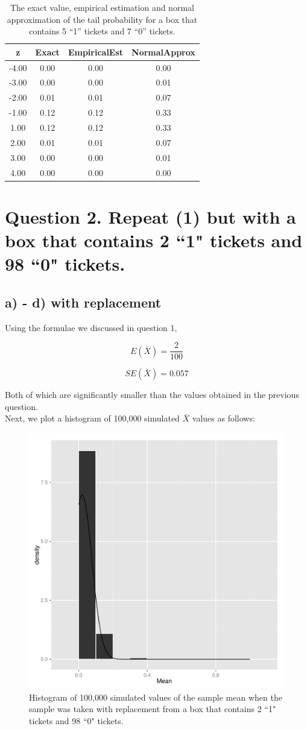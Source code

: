 \documentclass[11pt]{article}
\begin{document}
\begin{table}[H]
\centering
\begin{tabular}{|c|ccc|}
  \hline
z & Exact & EmpiricalEst & NormalApprox \\ 
  \hline
-4.00 & 0.00 & 0.00 & 0.00 \\ 
  -3.00 & 0.00 & 0.00 & 0.01 \\ 
  -2.00 & 0.01 & 0.01 & 0.07 \\ 
  -1.00 & 0.12 & 0.12 & 0.33 \\ 
  1.00 & 0.12 & 0.12 & 0.33 \\ 
  2.00 & 0.01 & 0.01 & 0.07 \\ 
  3.00 & 0.00 & 0.00 & 0.01 \\ 
  4.00 & 0.00 & 0.00 & 0.00 \\ 
   \hline
\end{tabular}
\caption{The exact value, empirical estimation and normal approximation of the tail probability for a box that contains 5 ``1'' tickets and 7 ``0'' tickets.} 
\end{table}






\pagebreak

 \section*{Question 2. Repeat (1) but with a box that contains 2 ``1" tickets and 98 ``0" tickets.}
 
 \subsection*{a) - d) with replacement}
Using the formulae we discussed in question 1,

$$E(\bar{X})= \frac{2}{100}$$ 
 
 $$SE(\bar{X}) = 0.057$$
 
 \noindent Both of which are significantly smaller than the values obtained in the previous question.\\ 

\noindent Next, we plot a histogram of 100,000 simulated $\bar{X}$ values as follows:
 
\begin{figure}[H]
\centering
\includegraphics[width = .5\textwidth]{histogram_2c-1.pdf}
\caption{Histogram of 100,000 simulated values of the sample mean when the sample was taken with replacement from a box that contains 2 ``1" tickets and 98 ``0" tickets.}\label{q2}
\end{figure}
 
\end{document}
